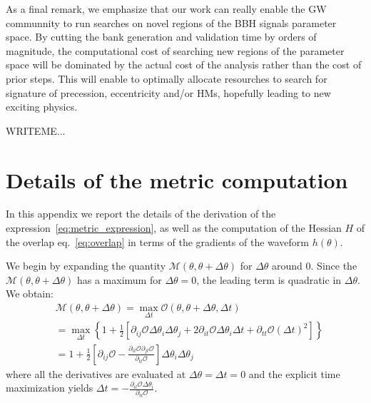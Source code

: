 \documentclass[twocolumn,showpacs,preprintnumbers,nofootinbib,prd,
superscriptaddress,10pt]{revtex4-2}
\begin{document}
As a final remark, we emphasize that our work can really enable the GW communnity to run searches on novel regions of the BBH signals parameter space. By cutting the bank generation and validation time by orders of magnitude, the computational cost of searching new regions of the parameter space will be dominated by the actual cost of the analysis rather than the cost of prior steps.
This will enable to optimally allocate resourches to search for signature of precession, eccentricity and/or HMs, hopefully leading to new exciting physics.

        \begin{acknowledgments}
         
          WRITEME...
        \end{acknowledgments}

\newpage
\appendix
\section{Details of the metric computation}\label{app:metric}

In this appendix we report the details of the derivation of the expression~\eqref{eq:metric_expression}, as well as the computation of the Hessian $H$ of the overlap eq.~\eqref{eq:overlap} in terms of the gradients of the waveform $h(\theta)$. 

We begin by expanding the quantity $\mathcal{M}(\theta,\theta +\Delta\theta)$ for $\Delta\theta$ around $0$. Since the $\mathcal{M}(\theta,\theta +\Delta\theta)$ has a maximum for $\Delta\theta = 0$, the leading term is quadratic in $\Delta\theta$.
We obtain:
\begin{align} \label{eq:metric_derivation}
	&\mathcal{M}(\theta,\theta +\Delta\theta) = \max_{\Delta t} \mathcal{O}(\theta, \theta + \Delta\theta, \Delta t) \nonumber\\
	& =	\max_{\Delta t} \left\{ 1+ \frac{1}{2}\left[ \partial_{ij}\mathcal{O} \Delta\theta_i \Delta\theta_j + 2  \partial_{it}\mathcal{O} \Delta\theta_i \Delta t + \partial_{tt}\mathcal{O} (\Delta t)^2 \right] \right\}  \nonumber \\
	&= 1 + \frac{1}{2}\left[ \partial_{ij}\mathcal{O} - \frac{\partial_{it}\mathcal{O} \partial_{jt}\mathcal{O}}{\partial_{tt}\mathcal{O}}\right] \Delta\theta_i \Delta\theta_j
\end{align}
where all the derivatives are evaluated at ${\Delta\theta = \Delta t = 0}$ and the explicit time maximization yields
${\Delta t = -\frac{\partial_{it}\mathcal{O} \Delta\theta_i}{\partial_{tt}\mathcal{O}}}$.
\end{document}
